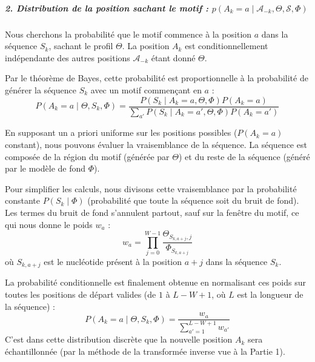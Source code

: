 \subparagraph{2. Distribution de la position sachant le motif : $p(A_k = a \mid \mathcal{A}_{-k}, \Theta, \mathcal{S}, \Phi)$}

Nous cherchons la probabilité que le motif commence à la position $a$ dans la 
séquence $S_k$, sachant le profil $\Theta$. La position $A_k$ est conditionnellement 
indépendante des autres positions $\mathcal{A}_{-k}$ étant donné $\Theta$.

Par le théorème de Bayes, cette probabilité est proportionnelle à la probabilité de 
générer la séquence $S_k$ avec un motif commençant en $a$ :
\begin{equation}
    P(A_k = a \mid \Theta, S_k, \Phi) = \frac{P(S_k \mid A_k = a, \Theta, \Phi) P(A_k = a)}{\sum_{a'} P(S_k \mid A_k = a', \Theta, \Phi) P(A_k = a')}
\end{equation}

En supposant un a priori uniforme sur les positions possibles ($P(A_k = a)$ constant), nous pouvons évaluer la vraisemblance de la séquence. La séquence est composée de la région du motif (générée par $\Theta$) et du reste de la séquence (généré par le modèle de fond $\Phi$). 

Pour simplifier les calculs, nous divisons cette vraisemblance par la probabilité 
constante $P(S_k \mid \Phi)$ (probabilité que toute la séquence soit du bruit de fond). 
Les termes du bruit de fond s'annulent partout, sauf sur la fenêtre du motif, ce qui 
nous donne le poids $w_a$ :
\begin{equation}
    w_a = \prod_{j=0}^{W-1} \frac{\Theta_{S_{k, a+j}, j}}{\Phi_{S_{k, a+j}}}
\end{equation}
où $S_{k, a+j}$ est le nucléotide présent à la position $a+j$ dans la séquence $S_k$.

La probabilité conditionnelle est finalement obtenue en normalisant ces poids sur 
toutes les positions de départ valides (de $1$ à $L-W+1$, où $L$ est la longueur de la 
séquence) :
\begin{equation}
    P(A_k = a \mid \Theta, S_k, \Phi) = \frac{w_a}{\sum_{a'=1}^{L-W+1} w_{a'}}
\end{equation}
C'est dans cette distribution discrète que la nouvelle position $A_k$ sera 
échantillonnée (par la méthode de la transformée inverse vue à la Partie 1).